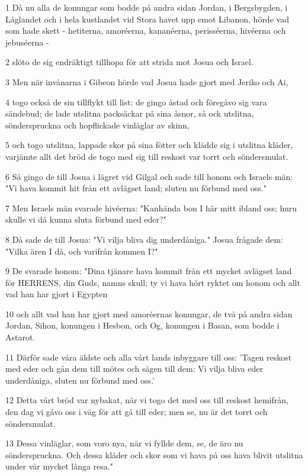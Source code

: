 \par 1 Då nu alla de konungar som bodde på andra sidan Jordan, i Bergsbygden, i Låglandet och i hela kustlandet vid Stora havet upp emot Libanon, hörde vad som hade skett - hetiterna, amoréerna, kananéerna, perisséerna, hivéerna och jebuséerna -
\par 2 slöto de sig endräktigt tillhopa för att strida mot Josua och Israel.
\par 3 Men när invånarna i Gibeon hörde vad Josua hade gjort med Jeriko och Ai,
\par 4 togo också de sin tillflykt till list: de gingo åstad och föregåvo sig vara sändebud; de lade utslitna packsäckar på sina åsnor, så ock utslitna, sönderspruckna och hopflickade vinläglar av skinn,
\par 5 och togo utslitna, lappade skor på sina fötter och klädde sig i utslitna kläder, varjämte allt det bröd de togo med sig till reskost var torrt och söndersmulat.
\par 6 Så gingo de till Josua i lägret vid Gilgal och sade till honom och Israels män: "Vi hava kommit hit från ett avlägset land; sluten nu förbund med oss."
\par 7 Men Israels män svarade hivéerna: "Kanhända bon I här mitt ibland oss; huru skulle vi då kunna sluta förbund med eder?"
\par 8 Då sade de till Josua: "Vi vilja bliva dig underdåniga." Josua frågade dem: "Vilka ären I då, och varifrån kommen I?"
\par 9 De svarade honom: "Dina tjänare hava kommit från ett mycket avlägset land för HERRENS, din Guds, namns skull; ty vi hava hört ryktet om honom och allt vad han har gjort i Egypten
\par 10 och allt vad han har gjort med amoréernas konungar, de två på andra sidan Jordan, Sihon, konungen i Hesbon, och Og, konungen i Basan, som bodde i Astarot.
\par 11 Därför sade våra äldste och alla vårt lands inbyggare till oss: 'Tagen reskost med eder och gån dem till mötes och sägen till dem: Vi vilja bliva eder underdåniga, sluten nu förbund med oss.'
\par 12 Detta vårt bröd var nybakat, när vi togo det med oss till reskost hemifrån, den dag vi gåvo oss i väg för att gå till eder; men se, nu är det torrt och söndersmulat.
\par 13 Dessa vinläglar, som voro nya, när vi fyllde dem, se, de äro nu sönderspruckna. Och dessa kläder och skor som vi hava på oss hava blivit utslitna under vår mycket långa resa."
